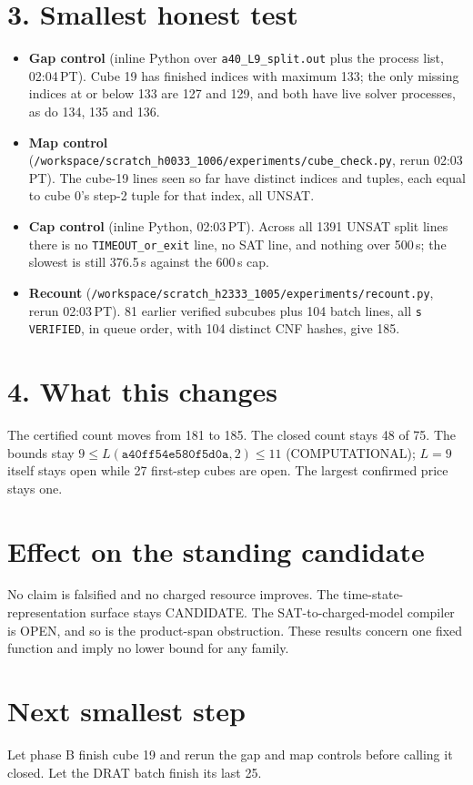 \documentclass[11pt]{article}
\begin{document}
\section*{3. Smallest honest test}
\begin{itemize}
\item \textbf{Gap control} (inline Python over \texttt{a40\_L9\_split.out} plus the process list, 02:04\,PT). Cube 19 has finished indices with maximum 133; the only missing indices at or below 133 are 127 and 129, and both have live solver processes, as do 134, 135 and 136.
\item \textbf{Map control} (\texttt{/workspace/scratch\_h0033\_1006/experiments/cube\_check.py}, rerun 02:03\,PT). The cube-19 lines seen so far have distinct indices and tuples, each equal to cube 0's step-2 tuple for that index, all UNSAT.
\item \textbf{Cap control} (inline Python, 02:03\,PT). Across all 1391 UNSAT split lines there is no \texttt{TIMEOUT\_or\_exit} line, no SAT line, and nothing over 500\,s; the slowest is still 376.5\,s against the 600\,s cap.
\item \textbf{Recount} (\texttt{/workspace/scratch\_h2333\_1005/experiments/recount.py}, rerun 02:03\,PT). 81 earlier verified subcubes plus 104 batch lines, all \texttt{s VERIFIED}, in queue order, with 104 distinct CNF hashes, give 185.
\end{itemize}

\section*{4. What this changes}
The certified count moves from 181 to 185. The closed count stays 48 of 75. The bounds stay $9\le L(\texttt{a40ff54e580f5d0a},2)\le 11$ (COMPUTATIONAL); $L=9$ itself stays open while 27 first-step cubes are open. The largest confirmed price stays one.

\section*{Effect on the standing candidate}
No claim is falsified and no charged resource improves. The time-state-representation surface stays CANDIDATE. The SAT-to-charged-model compiler is OPEN, and so is the product-span obstruction. These results concern one fixed function and imply no lower bound for any family.

\section*{Next smallest step}
Let phase B finish cube 19 and rerun the gap and map controls before calling it closed. Let the DRAT batch finish its last 25.
\end{document}

